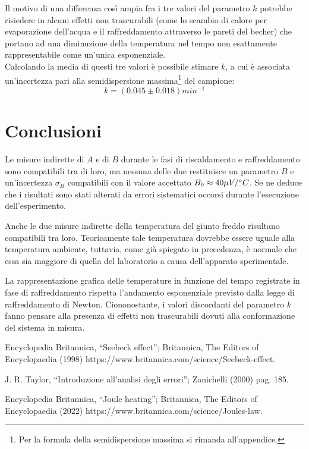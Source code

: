 \documentclass{article}
\begin{document}
\noindent Il motivo di una differenza così ampia fra i tre valori del parametro $k$ potrebbe risiedere in alcuni effetti non trascurabili (come lo scambio di calore per evaporazione dell’acqua e il raffreddamento attraverso le pareti del becher) che portano ad una diminuzione della temperatura nel tempo non esattamente rappresentabile come un’unica esponenziale. \\
Calcolando la media di questi tre valori è possibile stimare $k$, a cui è associata un'incertezza pari alla semidispersione massima\footnote{Per la formula della semidispersione massima si rimanda all'appendice.} del campione:
$$ k = ( 0.045 \pm 0.018 ) min ^ {-1} $$


\section{Conclusioni}
Le misure indirette di $A$ e di $B$ durante le fasi di riscaldamento e raffreddamento sono compatibili tra di loro, ma nessuna delle due restituisce un parametro $B$ e un'incertezza $\sigma_B$ compatibili con il valore accettato $B_0 \approx 40 \mu V/\degree C$. Se ne deduce che i risultati sono stati alterati da errori sistematici occorsi durante l'esecuzione dell'esperimento.

Anche le due misure indirette della temperatura del giunto freddo risultano compatibili tra loro. Teoricamente tale temperatura dovrebbe essere uguale alla temperatura ambiente, tuttavia, come già spiegato in precedenza, è normale che essa sia maggiore di quella del laboratorio a causa dell'apparato sperimentale.

La rappresentazione grafica delle temperature in funzione del tempo registrate in fase di raffreddamento rispetta l'andamento esponenziale previsto dalla legge di raffreddamento di Newton. Ciononostante, i valori discordanti del parametro $k$ fanno pensare alla presenza di effetti non trascurabili dovuti alla conformazione del sistema in misura.

\newpage

\begin{thebibliography}{9}
Encyclopedia Britannica, “Seebeck effect”; Britannica, The Editors of Encyclopaedia (1998) https://www.britannica.com/science/Seebeck-effect.

J. R. Taylor, “Introduzione all'analisi degli errori”; Zanichelli (2000) pag. 185.

Encyclopedia Britannica, “Joule heating”; Britannica, The Editors of Encyclopaedia (2022) https://www.britannica.com/science/Joules-law. 
\end{thebibliography}
\end{document}
